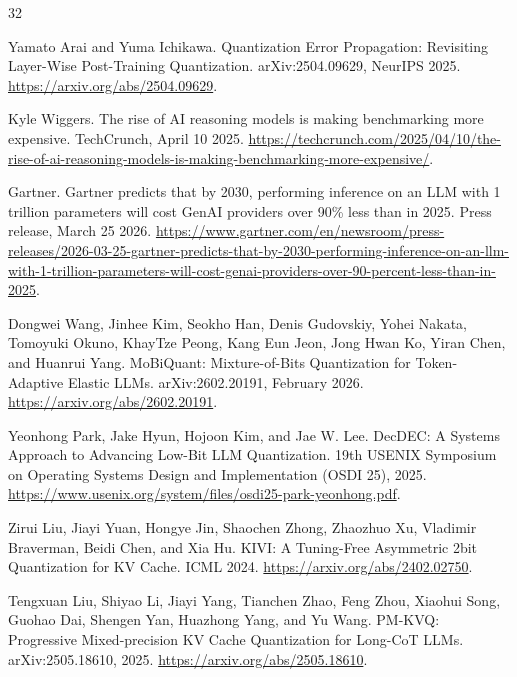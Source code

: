 \documentclass{article}
\begin{document}
\begin{thebibliography}{32}

Yamato Arai and Yuma Ichikawa.
\newblock Quantization Error Propagation: Revisiting Layer-Wise
Post-Training Quantization.
\newblock arXiv:2504.09629, NeurIPS 2025.
\newblock \url{https://arxiv.org/abs/2504.09629}.

Kyle Wiggers.
\newblock The rise of AI reasoning models is making benchmarking more
expensive.
\newblock TechCrunch, April 10 2025.
\newblock \url{https://techcrunch.com/2025/04/10/the-rise-of-ai-reasoning-models-is-making-benchmarking-more-expensive/}.

Gartner.
\newblock Gartner predicts that by 2030, performing inference on an LLM with
1 trillion parameters will cost GenAI providers over 90\% less than in 2025.
\newblock Press release, March 25 2026.
\newblock \url{https://www.gartner.com/en/newsroom/press-releases/2026-03-25-gartner-predicts-that-by-2030-performing-inference-on-an-llm-with-1-trillion-parameters-will-cost-genai-providers-over-90-percent-less-than-in-2025}.

Dongwei Wang, Jinhee Kim, Seokho Han, Denis Gudovskiy, Yohei Nakata,
Tomoyuki Okuno, KhayTze Peong, Kang Eun Jeon, Jong Hwan Ko, Yiran Chen, and
Huanrui Yang.
\newblock MoBiQuant: Mixture-of-Bits Quantization for Token-Adaptive Elastic
LLMs.
\newblock arXiv:2602.20191, February 2026.
\newblock \url{https://arxiv.org/abs/2602.20191}.

Yeonhong Park, Jake Hyun, Hojoon Kim, and Jae W. Lee.
\newblock DecDEC: A Systems Approach to Advancing Low-Bit LLM Quantization.
\newblock 19th USENIX Symposium on Operating Systems Design and
Implementation (OSDI 25), 2025.
\newblock \url{https://www.usenix.org/system/files/osdi25-park-yeonhong.pdf}.

Zirui Liu, Jiayi Yuan, Hongye Jin, Shaochen Zhong, Zhaozhuo Xu, Vladimir
Braverman, Beidi Chen, and Xia Hu.
\newblock KIVI: A Tuning-Free Asymmetric 2bit Quantization for KV Cache.
\newblock ICML 2024.
\newblock \url{https://arxiv.org/abs/2402.02750}.

Tengxuan Liu, Shiyao Li, Jiayi Yang, Tianchen Zhao, Feng Zhou, Xiaohui Song,
Guohao Dai, Shengen Yan, Huazhong Yang, and Yu Wang.
\newblock PM-KVQ: Progressive Mixed-precision KV Cache Quantization for
Long-CoT LLMs.
\newblock arXiv:2505.18610, 2025.
\newblock \url{https://arxiv.org/abs/2505.18610}.


\end{thebibliography}
\end{document}
